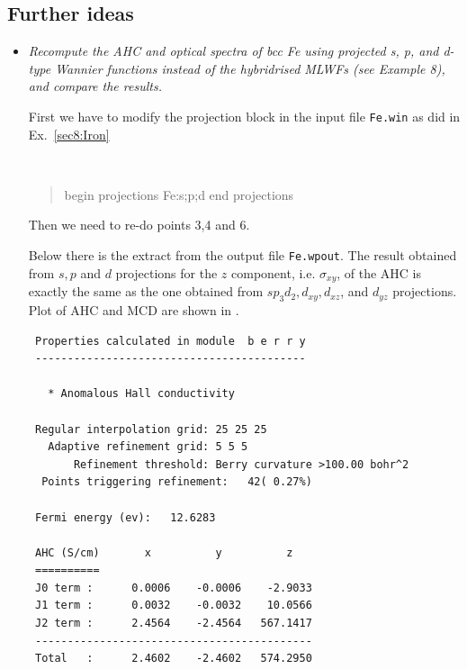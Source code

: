 \subsection*{Further ideas}
\begin{itemize}
	\item {\it Recompute the AHC and optical spectra of bcc Fe using projected s, p, and d-type Wannier
functions instead of the hybridrised MLWFs (see Example 8), and compare the results.}

First we have to modify the projection block in the input file {\tt Fe.win} as did in Ex.~\ref{sec8:Iron}

{\tt
\begin{quote}
begin projections
Fe:s;p;d
end projections
\end{quote}
}

Then we need to re-do points 3,4 and 6.

Below there is the extract from the output file {\tt Fe.wpout}. The result obtained from $s,p$ and $d$ projections for the $z$ component, i.e. $\sigma_{xy}$, of the AHC is exactly the same as the one obtained from $sp_3d_2,d_{xy},d_{xz}$, and $d_{yz}$ projections. Plot of AHC and MCD are shown in .
	{\small
	\begin{tcolorbox}[title=With adaptive refinement,sharp corners,boxrule=0.5pt]
	\begin{verbatim}
 Properties calculated in module  b e r r y
 ------------------------------------------

   * Anomalous Hall conductivity
  
 Regular interpolation grid: 25 25 25
   Adaptive refinement grid: 5 5 5
       Refinement threshold: Berry curvature >100.00 bohr^2
  Points triggering refinement:   42( 0.27%)

 Fermi energy (ev):   12.6283

 AHC (S/cm)       x          y          z
 ==========
 J0 term :      0.0006    -0.0006    -2.9033
 J1 term :      0.0032    -0.0032    10.0566
 J2 term :      2.4564    -2.4564   567.1417
 -------------------------------------------
 Total   :      2.4602    -2.4602   574.2950

	\end{verbatim}
	\end{tcolorbox}
	}


\end{itemize}
